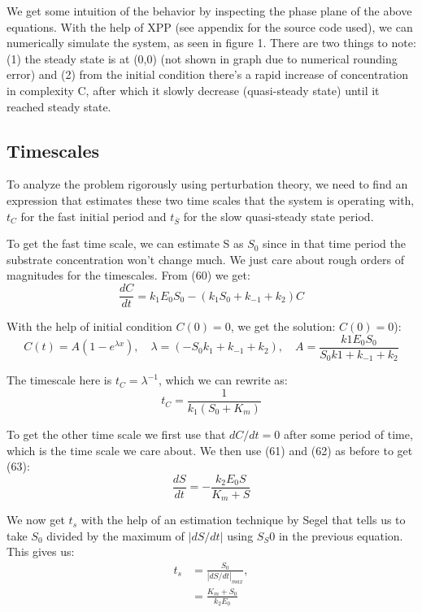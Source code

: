 \documentclass[12pt]{article}
\begin{document}
We get some intuition of the behavior by inspecting the phase plane of
the above equations. With the help of XPP (see appendix for the source
code used), we can numerically simulate the system, as seen in figure
1. There are two things to note: (1) the steady state is at (0,0) (not
shown in graph due to numerical rounding error) and (2) from the initial
condition there's a rapid increase of concentration in complexity C,
after which it slowly decrease (quasi-steady state) until it reached
steady state.

\subsection{Timescales}

To analyze the problem rigorously using perturbation theory, we need
to find an expression that estimates these two time scales that the
system is operating with, $t_C$ for the fast initial period and
$t_{\overline{S}}$ for the slow quasi-steady state period.

To get the fast time scale, we can estimate S as $S_0$ since in that
time period the substrate concentration won't change much. We just
care about rough orders of magnitudes for the timescales. From (60) we
get:
\begin{equation}
  \frac{dC}{dt} = k_1E_0 S_0 - (k_1 S_0 + k_{-1} + k_2)C
\end{equation}

With the help of initial condition $C(0)=0$, we get the solution:
$C(0)=0$):
\begin{equation}
  C(t) = A(1 -  e^{\lambda x}), \quad
  \lambda = (-S_0 k_1 + k_{-1} + k_2), \quad
  A =\frac{k1 E_0 S_0}{S_0 k1 + k_{-1} + k_2}
\end{equation}

The timescale here is $t_C = \lambda^{-1}$, which we can rewrite as:
\begin{equation}
  t_C = \frac{1}{k_1(S_0+K_m)}
\end{equation}

To get the other time scale we first use that $dC/dt = 0$ after some
period of time, which is the time scale we care about. We then use
(61) and (62) as before to get (63):
\begin{equation}
  \frac{dS}{dt} = -\frac{k_2 E_0 S}{K_m + S}
\end{equation}

We now get $t_s$ with the help of an estimation technique by Segel
\cite{segel1984modeling} that tells us to take $S_0$ divided by the
maximum of $|dS/dt|$ using $S_S0$ in the previous equation. This gives
us:
\begin{align}
  t_s &= \frac{S_0}{|dS/dt|_{max}}, \\
      &= \frac{K_m + S_0}{k_2 E_0}
\end{align}
\end{document}
